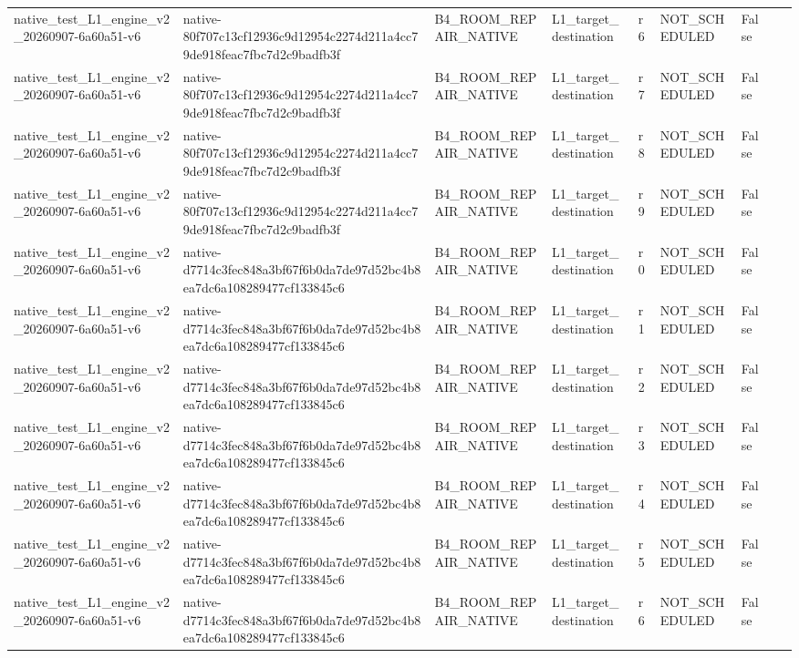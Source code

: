 \begin{tabular}{lllllllll}
native\_test\_L1\_engine\_v2\_20260907-6a60a51-v6 & native-80f707c13cf12936c9d12954c2274d211a4cc79de918feac7fbc7d2c9badfb3f & B4\_ROOM\_REPAIR\_NATIVE & L1\_target\_destination & r6 & NOT\_SCHEDULED & False &  &  \\
native\_test\_L1\_engine\_v2\_20260907-6a60a51-v6 & native-80f707c13cf12936c9d12954c2274d211a4cc79de918feac7fbc7d2c9badfb3f & B4\_ROOM\_REPAIR\_NATIVE & L1\_target\_destination & r7 & NOT\_SCHEDULED & False &  &  \\
native\_test\_L1\_engine\_v2\_20260907-6a60a51-v6 & native-80f707c13cf12936c9d12954c2274d211a4cc79de918feac7fbc7d2c9badfb3f & B4\_ROOM\_REPAIR\_NATIVE & L1\_target\_destination & r8 & NOT\_SCHEDULED & False &  &  \\
native\_test\_L1\_engine\_v2\_20260907-6a60a51-v6 & native-80f707c13cf12936c9d12954c2274d211a4cc79de918feac7fbc7d2c9badfb3f & B4\_ROOM\_REPAIR\_NATIVE & L1\_target\_destination & r9 & NOT\_SCHEDULED & False &  &  \\
native\_test\_L1\_engine\_v2\_20260907-6a60a51-v6 & native-d7714c3fec848a3bf67f6b0da7de97d52bc4b8ea7dc6a108289477cf133845c6 & B4\_ROOM\_REPAIR\_NATIVE & L1\_target\_destination & r0 & NOT\_SCHEDULED & False &  &  \\
native\_test\_L1\_engine\_v2\_20260907-6a60a51-v6 & native-d7714c3fec848a3bf67f6b0da7de97d52bc4b8ea7dc6a108289477cf133845c6 & B4\_ROOM\_REPAIR\_NATIVE & L1\_target\_destination & r1 & NOT\_SCHEDULED & False &  &  \\
native\_test\_L1\_engine\_v2\_20260907-6a60a51-v6 & native-d7714c3fec848a3bf67f6b0da7de97d52bc4b8ea7dc6a108289477cf133845c6 & B4\_ROOM\_REPAIR\_NATIVE & L1\_target\_destination & r2 & NOT\_SCHEDULED & False &  &  \\
native\_test\_L1\_engine\_v2\_20260907-6a60a51-v6 & native-d7714c3fec848a3bf67f6b0da7de97d52bc4b8ea7dc6a108289477cf133845c6 & B4\_ROOM\_REPAIR\_NATIVE & L1\_target\_destination & r3 & NOT\_SCHEDULED & False &  &  \\
native\_test\_L1\_engine\_v2\_20260907-6a60a51-v6 & native-d7714c3fec848a3bf67f6b0da7de97d52bc4b8ea7dc6a108289477cf133845c6 & B4\_ROOM\_REPAIR\_NATIVE & L1\_target\_destination & r4 & NOT\_SCHEDULED & False &  &  \\
native\_test\_L1\_engine\_v2\_20260907-6a60a51-v6 & native-d7714c3fec848a3bf67f6b0da7de97d52bc4b8ea7dc6a108289477cf133845c6 & B4\_ROOM\_REPAIR\_NATIVE & L1\_target\_destination & r5 & NOT\_SCHEDULED & False &  &  \\
native\_test\_L1\_engine\_v2\_20260907-6a60a51-v6 & native-d7714c3fec848a3bf67f6b0da7de97d52bc4b8ea7dc6a108289477cf133845c6 & B4\_ROOM\_REPAIR\_NATIVE & L1\_target\_destination & r6 & NOT\_SCHEDULED & False &  &  \\

\end{tabular}
